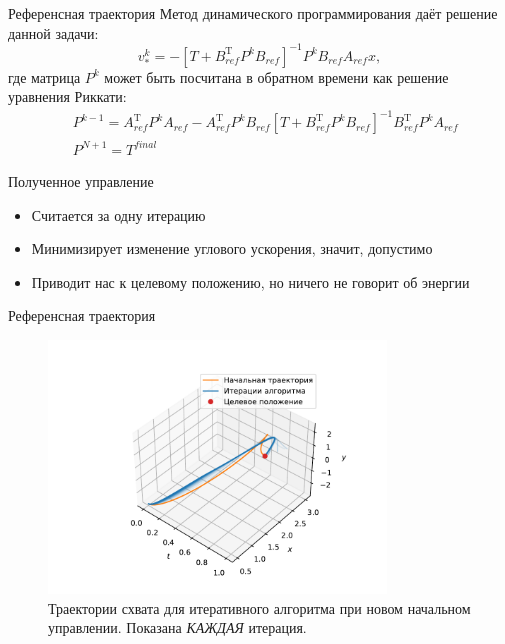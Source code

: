 \documentclass[16pt]{beamer}
\begin{document}
    \begin{frame}{Референсная траектория}
        Метод динамического программирования даёт решение данной задачи:
        $$
            v^k_* = -[T + B_{ref}^{\mathrm{T}}P^kB_{ref}]^{-1}P^kB_{ref}A_{ref} x,
        $$
        где матрица $P^k$ может быть посчитана в обратном времени как решение уравнения Риккати:
        $$
            \begin{aligned}
                &P^{k-1} = A_{ref}^{\mathrm{T}} P^{k} A_{ref} - A_{ref}^{\mathrm{T}}P^kB_{ref}[T + B_{ref}^\mathrm{T}P^kB_{ref}]^{-1}B_{ref}^{\mathrm{T}}P^{k}A_{ref}
                \\
                &P^{N+1} = T^{final}
            \end{aligned}
        $$
        \begin{block}{Полученное управление}
            \begin{itemize}
                \item Считается за одну итерацию
                \item Минимизирует изменение углового ускорения, значит, допустимо
                \item Приводит нас к целевому положению, но ничего не говорит об энергии
            \end{itemize}
        \end{block}
    \end{frame}

    \begin{frame}{Референсная траектория}
        \begin{figure}
            \includegraphics[width=0.8\textwidth]{img/ddp_dummy.pdf}
            \caption{Траектории схвата для итеративного алгоритма при новом начальном управлении. Показана \textit{КАЖДАЯ} итерация.}
        \end{figure}
    \end{frame}
\end{document}
